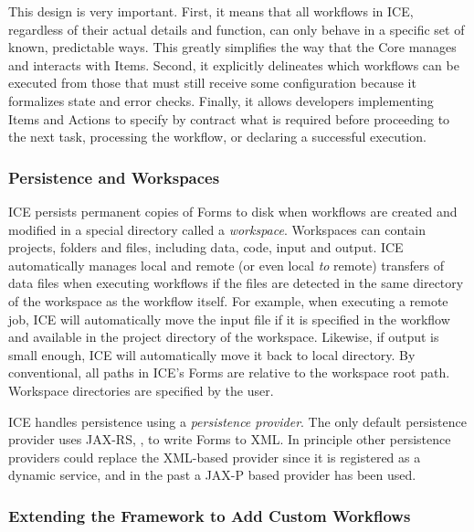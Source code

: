 This design is very important. First, it means that all workflows in
ICE, regardless of their actual details and function, can only behave in
a specific set of known, predictable ways. This greatly simplifies the
way that the Core manages and interacts with Items. Second, it
explicitly delineates which workflows can be executed from those that
must still receive some configuration because it formalizes state and
error checks. Finally, it allows developers implementing Items and
Actions to specify by contract what is required before proceeding to the
next task, processing the workflow, or declaring a successful execution.

\subsubsection{Persistence and
Workspaces}\label{persistence-and-workspaces}

ICE persists permanent copies of Forms to disk when workflows are
created and modified in a special directory called a \emph{workspace}.
Workspaces can contain projects, folders and files, including data,
code, input and output. ICE automatically manages local and remote (or
even local \emph{to} remote) transfers of data files when executing
workflows if the files are detected in the same directory of the
workspace as the workflow itself. For example, when executing a remote
job, ICE will automatically move the input file if it is specified in
the workflow and available in the project directory of the workspace.
Likewise, if output is small enough, ICE will automatically move it back
to local directory. By conventional, all paths in ICE's Forms are
relative to the workspace root path. Workspace directories are specified
by the user.

ICE handles persistence using a \emph{persistence provider}. The only
default persistence provider uses JAX-RS, \cite{burke_restful_2010}, to write
Forms to XML. In principle other persistence providers could replace the
XML-based provider since it is registered as a dynamic service, and in
the past a JAX-P based provider has been used.

\subsubsection{Extending the Framework to Add Custom
Workflows}\label{extending-the-framework-to-add-custom-workflows}

